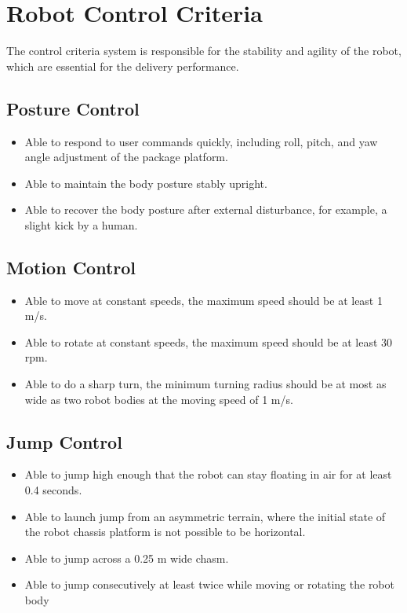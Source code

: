 \documentclass[12pt]{article}
\begin{document}
\section{Robot Control Criteria}
The control criteria system is responsible for the stability and agility of the robot, which are essential for the delivery performance.
    \subsection{Posture Control}
        \begin{itemize}
            \item Able to respond to user commands quickly, including roll, pitch, and yaw angle adjustment of the package platform.
            \item Able to maintain the body posture stably upright.
            \item Able to recover the body posture after external disturbance, for example, a slight kick by a human.
        \end{itemize}
    \subsection{Motion Control}
        \begin{itemize}
            \item Able to move at constant speeds, the maximum speed should be at least 1 m/s.
            \item Able to rotate at constant speeds, the maximum speed should be at least 30 rpm.
            \item Able to do a sharp turn, the minimum turning radius should be at most as wide as two robot bodies at the moving speed of 1 m/s.
        \end{itemize}
    \subsection{Jump Control}
        \begin{itemize}
            \item Able to jump high enough that the robot can stay floating in air for at least 0.4 seconds.
            \item Able to launch jump from an asymmetric terrain, where the initial state of the robot chassis platform is not possible to be horizontal.
            \item Able to jump across a 0.25 m wide chasm.
            \item Able to jump consecutively at least twice while moving or rotating the robot body
        \end{itemize}
\end{document}

